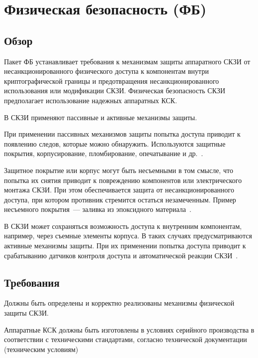 \section{Физическая безопасность (ФБ)}\label{PS}

\subsection{Обзор}\label{PS.Intro}

Пакет ФБ устанавливает требования к механизмам защиты аппаратного СКЗИ 
от несанкционированного физического доступа к компонентам внутри 
криптографической границы и предотвращения несанкционированного использования 
или модификации СКЗИ.
%
Физическая безопасность СКЗИ предполагает использование надежных аппаратных 
КСК. 

В СКЗИ применяют пассивные и активные механизмы защиты.

При применении пассивных механизмов защиты попытка доступа приводит к появлению
следов, которые можно обнаружить. Используются защитные покрытия,
корпусирование, пломбирование, опечатывание и
др.~.

Защитное покрытие или корпус могут быть несъемными в том смысле, что попытка их 
снятия приводит к повреждению компонентов или электрического монтажа СКЗИ. 
%
При этом обеспечивается защита от несанкционированного доступа, 
при котором противник стремится остаться незамеченным.
%
Пример несъемного покрытия~--- заливка из эпоксидного 
материала~. 
 
В СКЗИ может сохраняться возможность доступа к внутренним компонентам,
например, через съемные элементы корпуса. 
%
В таких случаях предусматриваются активные механизмы защиты. При их применении 
попытка доступа приводит к срабатыванию датчиков контроля доступа и 
автоматической реакции СКЗИ~.

\subsection{Требования}\label{PS.Reqs}

\label{R.PS.List} %
Должны быть определены и корректно реализованы механизмы физической защиты СКЗИ. 

\label{R.PS.Production} %
Аппаратные КСК должны быть изготовлены в условиях серийного 
производства в соответствии с техническими стандартами, согласно технической 
документации (техническим условиям)

